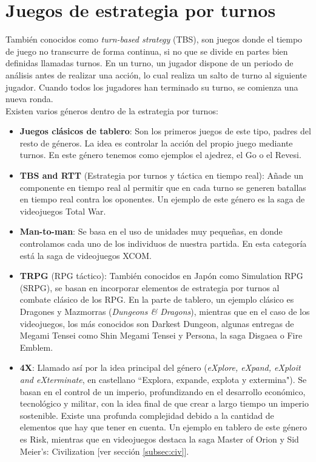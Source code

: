 \section{Juegos de estrategia por turnos}

También conocidos como \textit{turn-based strategy} (TBS), son juegos donde el tiempo de juego no transcurre de forma continua, si no que se divide en partes bien definidas llamadas turnos. En un turno, un jugador dispone de un periodo de análisis antes de realizar una acción, lo cual realiza un salto de turno al siguiente jugador. Cuando todos los jugadores han terminado su turno, se comienza una nueva ronda. \\

Existen varios géneros dentro de la estrategia por turnos: 

\begin{itemize}
	\item \textbf{Juegos clásicos de tablero}: Son los primeros juegos de este tipo, padres del resto de géneros. La idea es controlar la acción del propio juego mediante turnos. En este género tenemos como ejemplos el ajedrez, el Go o el Revesi.
	\item \textbf{TBS and RTT} (Estrategia por turnos y táctica en tiempo real): Añade un componente en tiempo real al permitir que en cada turno se generen batallas en tiempo real contra los oponentes. Un ejemplo de este género es la saga de videojuegos Total War.
	\item \textbf{Man-to-man}: Se basa en el uso de unidades muy pequeñas, en donde controlamos cada uno de los individuos de nuestra partida. En esta categoría está la saga de videojuegos XCOM.
	\item \textbf{TRPG} (RPG táctico): También conocidos en Japón como Simulation RPG (SRPG), se basan en incorporar elementos de estrategia por turnos al combate clásico de los RPG. En la parte de tablero, un ejemplo clásico es Dragones y Mazmorras (\textit{Dungeons \& Dragons}), mientras que en el caso de los videojuegos, los más conocidos son Darkest Dungeon, algunas entregas de Megami Tensei como Shin Megami Tensei y Persona, la saga Disgaea o Fire Emblem.
	\item \textbf{4X}: Llamado así por la idea principal del género (\textit{eXplore, eXpand, eXploit and eXterminate}, en castellano ``Explora, expande, explota y extermina"). Se basan en el control de un imperio, profundizando en el desarrollo económico, tecnológico y militar, con la idea final de que crear a largo tiempo un imperio sostenible. Existe una profunda complejidad debido a la cantidad de elementos que hay que tener en cuenta. Un ejemplo en tablero de este género es Risk, mientras que en videojuegos destaca la saga Master of Orion y Sid Meier's: Civilization [ver sección \ref{subsec:civ}].
\end{itemize}

